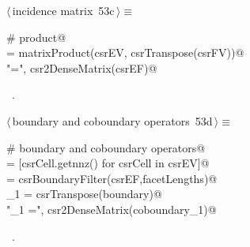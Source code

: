 \documentclass[11pt,oneside]{article}	%
\begin{document}
\begin{flushleft} \small \label{scrap89}
\protect{}$\langle\,$incidence matrix\nobreak\ {\footnotesize 53c}$\,\rangle\equiv$
\vspace{-1ex}
\begin{list}{}{} \item
\mbox{}\verb@# product@\\
\mbox{}\verb@csrEF = matrixProduct(csrEV, csrTranspose(csrFV))@\\
\mbox{}\verb@print "\nEF =\n", csr2DenseMatrix(csrEF)@\\
\mbox{}\verb@@{\NWsep}
\end{list}
\vspace{-1ex}
\footnotesize\addtolength{\baselineskip}{-1ex}
\begin{list}{}{\setlength{\itemsep}{-\parsep}\setlength{\itemindent}{-\leftmargin}}
\item \NWtxtMacroRefIn\ .
\end{list}
\end{flushleft}

\begin{flushleft} \small \label{scrap90}
\protect{}$\langle\,$boundary and coboundary operators\nobreak\ {\footnotesize 53d}$\,\rangle\equiv$
\vspace{-1ex}
\begin{list}{}{} \item
\mbox{}\verb@# boundary and coboundary operators@\\
\mbox{}\verb@facetLengths = [csrCell.getnnz() for csrCell in csrEV]@\\
\mbox{}\verb@boundary = csrBoundaryFilter(csrEF,facetLengths)@\\
\mbox{}\verb@coboundary_1 = csrTranspose(boundary)@\\
\mbox{}\verb@print "\ncoboundary_1 =\n", csr2DenseMatrix(coboundary_1)@\\
\mbox{}\verb@@{\NWsep}
\end{list}
\vspace{-1ex}
\footnotesize\addtolength{\baselineskip}{-1ex}
\begin{list}{}{\setlength{\itemsep}{-\parsep}\setlength{\itemindent}{-\leftmargin}}
\item \NWtxtMacroRefIn\ .
\end{list}
\end{flushleft}
\end{document}
